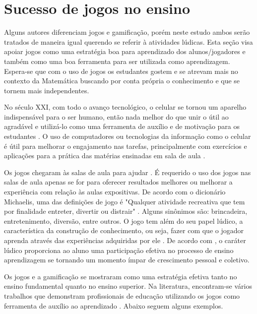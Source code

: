 
\section[Sucesso de jogos no ensino]{Sucesso de jogos no ensino}

Alguns autores diferenciam jogos e gamificação, porém neste estudo ambos serão tratados de maneira igual querendo se referir à atividades lúdicas. Esta seção visa apoiar jogos como uma estratégia boa para aprendizado dos alunos/jogadores e também como uma boa ferramenta para ser utilizada como aprendizagem. Espera-se que com o uso de jogos os estudantes gostem e se atrevam mais no contexto da Matemática buscando por conta própria o conhecimento e que se tornem mais independentes.

No século XXI, com todo o avanço tecnológico, o celular se tornou um aparelho indispensável para o ser humano, então nada melhor do que unir o útil ao agradável e utilizá-lo como uma ferramenta de auxílio e de motivação para os estudantes \cite{softwaregamificado}. O uso de computadores ou tecnologias da informação como o celular é útil para melhorar o engajamento nas tarefas, principalmente com exercícios e aplicações para a prática das matérias ensinadas em sala de aula \cite{tdahNasEscolas2}.

Os jogos chegaram às salas de aula para ajudar \cite[p. 4]{sucessoJogoEngSoft}. É requerido o uso dos jogos nas salas de aula apenas se for para oferecer resultados melhores ou melhorar a experiência com relação às aulas expositivas. De acordo com o dicionário Michaelis, uma das definições de jogo é "Qualquer atividade recreativa que tem por finalidade entreter, divertir ou distrair" \cite{Michaelis}. Alguns sinônimos são: brincadeira, entretenimento, diversão, entre outros. O jogo tem além do seu papel lúdico, a característica da construção de conhecimento, ou seja, fazer com que o jogador aprenda através das experiências adquiridas por ele \cite{jogoPratPedagoc} \cite{appcalculo} \cite{Nunes} \cite{fukusawa}. De acordo com \cite{jogoPratPedagoc}, o caráter lúdico proporciona ao aluno uma participação efetiva no processo de ensino aprendizagem se tornando um momento ímpar de crescimento pessoal e coletivo. 

Os jogos e a gamificação se mostraram como uma estratégia efetiva tanto no ensino fundamental quanto no ensino superior. Na literatura, encontram-se vários trabalhos que demonstram profissionais de educação utilizando os jogos como ferramenta de auxílio ao aprendizado \cite[p. 3]{sucessoJogoEngSoft}. Abaixo seguem alguns exemplos.

